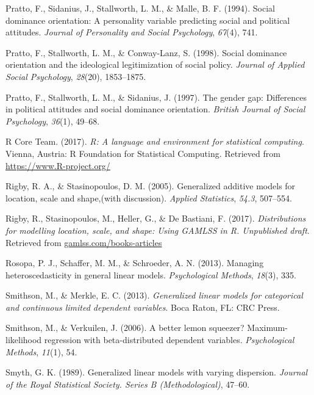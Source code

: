 \documentclass[english,man]{apa6}
\theoremstyle{definition}
\theoremstyle{definition}
\theoremstyle{remark}
\begin{document}
\hypertarget{ref-pratto1994social}{}
Pratto, F., Sidanius, J., Stallworth, L. M., \& Malle, B. F. (1994).
Social dominance orientation: A personality variable predicting social
and political attitudes. \emph{Journal of Personality and Social
Psychology}, \emph{67}(4), 741.

\hypertarget{ref-pratto1998social}{}
Pratto, F., Stallworth, L. M., \& Conway-Lanz, S. (1998). Social
dominance orientation and the ideological legitimization of social
policy. \emph{Journal of Applied Social Psychology}, \emph{28}(20),
1853--1875.

\hypertarget{ref-pratto1997gender}{}
Pratto, F., Stallworth, L. M., \& Sidanius, J. (1997). The gender gap:
Differences in political attitudes and social dominance orientation.
\emph{British Journal of Social Psychology}, \emph{36}(1), 49--68.

\hypertarget{ref-rcore2017}{}
R Core Team. (2017). \emph{R: A language and environment for statistical
computing}. Vienna, Austria: R Foundation for Statistical Computing.
Retrieved from \url{https://www.R-project.org/}

\hypertarget{ref-rigby2005generalized}{}
Rigby, R. A., \& Stasinopoulos, D. M. (2005). Generalized additive
models for location, scale and shape,(with discussion). \emph{Applied
Statistics}, \emph{54.3}, 507--554.

\hypertarget{ref-rigby2017distributions}{}
Rigby, R., Stasinopoulos, M., Heller, G., \& De Bastiani, F. (2017).
\emph{Distributions for modelling location, scale, and shape: Using
GAMLSS in R. Unpublished draft}. Retrieved from
\url{gamlss.com/books-articles}

\hypertarget{ref-rosopa2013managing}{}
Rosopa, P. J., Schaffer, M. M., \& Schroeder, A. N. (2013). Managing
heteroscedasticity in general linear models. \emph{Psychological
Methods}, \emph{18}(3), 335.

\hypertarget{ref-smithson2013generalized}{}
Smithson, M., \& Merkle, E. C. (2013). \emph{Generalized linear models
for categorical and continuous limited dependent variables}. Boca Raton,
FL: CRC Press.

\hypertarget{ref-smithson2006better}{}
Smithson, M., \& Verkuilen, J. (2006). A better lemon squeezer?
Maximum-likelihood regression with beta-distributed dependent variables.
\emph{Psychological Methods}, \emph{11}(1), 54.

\hypertarget{ref-smyth1989generalized}{}
Smyth, G. K. (1989). Generalized linear models with varying dispersion.
\emph{Journal of the Royal Statistical Society. Series B
(Methodological)}, 47--60.
\end{document}
